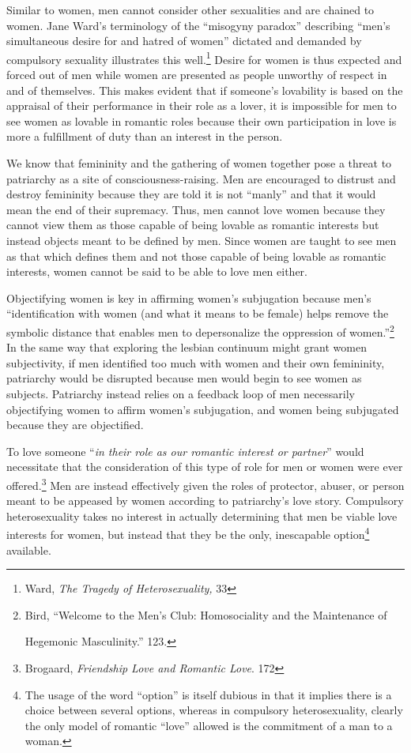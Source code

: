 Similar to women, men cannot consider other sexualities and are chained
to women. Jane Ward's terminology of the ``misogyny paradox'' describing
``men's simultaneous desire for and hatred of women'' dictated and
demanded by compulsory sexuality illustrates this well.\footnote{Ward,
  \emph{The Tragedy of Heterosexuality,} 33} Desire for women is thus
expected and forced out of men while women are presented as people
unworthy of respect in and of themselves. This makes evident that if
someone's lovability is based on the appraisal of their performance in
their role as a lover, it is impossible for men to see women as lovable
in romantic roles because their own participation in love is more a
fulfillment of duty than an interest in the person.

We know that femininity and the gathering of women together pose a
threat to patriarchy as a site of consciousness-raising. Men are
encouraged to distrust and destroy femininity because they are told it
is not ``manly'' and that it would mean the end of their supremacy.
Thus, men cannot love women because they cannot view them as those
capable of being lovable as romantic interests but instead objects meant
to be defined by men. Since women are taught to see men as that which
defines them and not those capable of being lovable as romantic
interests, women cannot be said to be able to love men either.

Objectifying women is key in affirming women's subjugation because men's
``identification with women (and what it means to be female) helps
remove the symbolic distance that enables men to depersonalize the
oppression of women.''\footnote{Bird, ``Welcome to the Men's Club:
  Homosociality and the Maintenance of

  Hegemonic Masculinity.'' 123.} In the same way that exploring the
lesbian continuum might grant women subjectivity, if men identified too
much with women and their own femininity, patriarchy would be disrupted
because men would begin to see women as subjects. Patriarchy instead
relies on a feedback loop of men necessarily objectifying women to
affirm women's subjugation, and women being subjugated because they are
objectified.

To love someone ``\emph{in their role as our romantic interest or
partner}'' would necessitate that the consideration of this type of role
for men or women were ever offered.\footnote{Brogaard, \emph{Friendship
  Love and Romantic Love}. 172} Men are instead effectively given the
roles of protector, abuser, or person meant to be appeased by women
according to patriarchy's love story. Compulsory heterosexuality takes
no interest in actually determining that men be viable love interests
for women, but instead that they be the only, inescapable
option\footnote{The usage of the word ``option'' is itself dubious in
  that it implies there is a choice between several options, whereas in
  compulsory heterosexuality, clearly the only model of romantic
  ``love'' allowed is the commitment of a man to a woman.} available.

